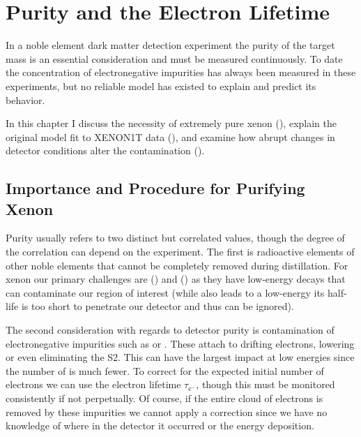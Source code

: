 

\pagestyle{cu}
\graphicspath{{./Chapter4/Figures/}}
\chapter[Purity and the Electron Lifetime][Purity and the Electron Lifetime]{Purity and the Electron Lifetime}
\label{chap:purification}

In a noble element dark matter detection experiment the purity of the target mass is an essential consideration and must be measured
continuously.  To date the concentration of electronegative impurities has always been measured in these experiments, but no reliable
model has existed to explain and predict its behavior.

In this chapter I discuss the necessity of extremely pure xenon (\secref{}), explain the original model fit to XENON1T data
(\secref{}), and examine how abrupt changes in detector conditions alter the contamination (\secref{}).



\section{Importance and Procedure for Purifying Xenon}
Purity usually refers to two distinct but correlated values, though the degree of the correlation can depend on the
experiment.  The first is radioactive elements of other noble elements that cannot be completely removed during distillation.  For xenon
our primary challenges are  () and 
() as they have low-energy decays that can contaminate our region of interest (while
 also leads to a low-energy \betadecay its half-life is too short to penetrate our detector and thus can be ignored).

The second consideration with regards to detector purity is contamination of electronegative impurities such as  or
.  These attach to drifting electrons, lowering or even eliminating the S2.  This can have the largest impact at low energies
since the number of \electron is much fewer.  To correct for the expected initial number of electrons we can use the electron lifetime
$\tau_{\mathrm{e^-}}$, though this must be monitored consistently if not perpetually.  Of course, if the entire cloud of electrons is
removed by these impurities we cannot apply a correction since we have no knowledge of where in the detector it occurred or the energy
deposition.

